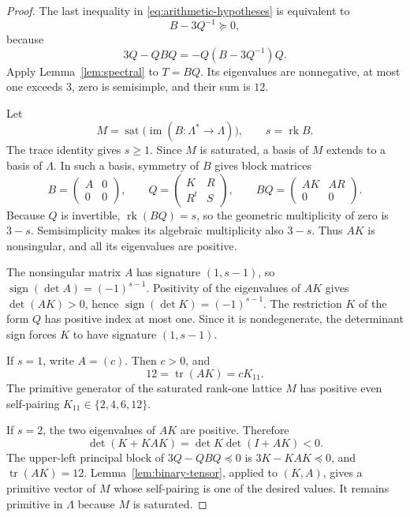 \documentclass[12pt]{amsart}
\numberwithin{equation}{section}
\theoremstyle{definition}
\theoremstyle{remark}
\newcommand{\R}{\mathbf R}
\newcommand{\rk}{\operatorname{rk}}
\newcommand{\tr}{\operatorname{tr}}
\newcommand{\sat}{\operatorname{sat}}
\begin{document}
\begin{proof}
The last inequality in \eqref{eq:arithmetic-hypotheses} is equivalent
to
\[
                              B-3Q^{-1}\succeq0,
\]
because
\[
                  3Q-QBQ=-Q(B-3Q^{-1})Q.
\]
Apply Lemma~\ref{lem:spectral} to $T=BQ$.  Its eigenvalues are
nonnegative, at most one exceeds $3$, zero is semisimple, and their
sum is $12$.

Let
\[
 M=\sat\bigl(\operatorname{im}(B:\Lambda^*\to\Lambda)\bigr),
          \qquad s=\rk B.
\]
The trace identity gives $s\geq1$.
Since $M$ is saturated, a basis of $M$ extends to a basis of $\Lambda$.
In such a basis, symmetry of $B$ gives block matrices
\begin{equation}\label{eq:block-forms}
 B=\begin{pmatrix}A&0\\0&0\end{pmatrix},
 \qquad
 Q=\begin{pmatrix}K&R\\R^t&S\end{pmatrix},
 \qquad
 BQ=\begin{pmatrix}AK&AR\\0&0\end{pmatrix}.
\end{equation}
Because $Q$ is invertible, $\rk(BQ)=s$, so the geometric multiplicity
of zero is $3-s$.  Semisimplicity makes its algebraic multiplicity
also $3-s$.  Thus $AK$ is nonsingular, and all its eigenvalues are
positive.

The nonsingular matrix $A$ has signature $(1,s-1)$, so
$\operatorname{sign}(\det A)=(-1)^{s-1}$.  Positivity of the eigenvalues
of $AK$ gives $\det(AK)>0$, hence
$\operatorname{sign}(\det K)=(-1)^{s-1}$.  The restriction $K$ of the
form $Q$ has positive index at most one.  Since it is nondegenerate,
the determinant sign forces $K$ to have signature $(1,s-1)$.

If $s=1$, write $A=(c)$.  Then $c>0$, and
\[
                         12=\tr(AK)=cK_{11}.
\]
The primitive generator of the saturated rank-one lattice $M$ has
positive even self-pairing $K_{11}\in\{2,4,6,12\}$.

If $s=2$, the two eigenvalues of $AK$ are positive.  Therefore
\[
 \det(K+KAK)=\det K\det(I+AK)<0.
\]
The upper-left principal block of $3Q-QBQ\preceq0$ is
$3K-KAK\preceq0$, and $\tr(AK)=12$.  Lemma~\ref{lem:binary-tensor}, applied to $(K,A)$, gives a primitive vector of $M$ whose self-pairing is one of the desired values. It remains primitive in $\Lambda$ because $M$ is saturated.


\end{proof}
\end{document}
